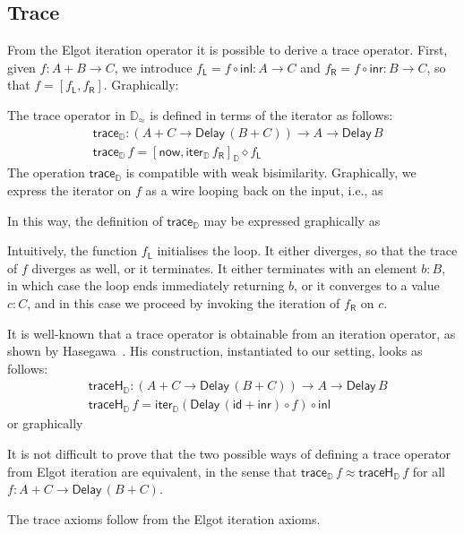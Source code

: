 \documentclass[runningheads,a4paper]{llncs}
\newcommand{\comp}{\circ}
\newcommand{\inl}{\mathsf{inl}}
\newcommand{\inr}{\mathsf{inr}}
\newcommand{\mapL}[1]{#1_{\mathsf{L}}}
\newcommand{\mapR}[1]{#1_{\mathsf{R}}}
\newcommand{\id}{\mathsf{id}}
\newcommand{\Delay}{\ensuremath{\mathsf{Delay}\,}}
\newcommand{\now}{\mathsf{now}}
\newcommand{\D}{\mathbb{D}}
\newcommand{\Dapprox}{\mathbb{D}_{\approx}}
\newcommand{\copairD}[2]{[#1,#2]_{\D}}
\newcommand{\iterD}{\mathsf{iter}_\D}
\newcommand{\traceD}{\mathsf{trace}_\D}
\newcommand{\traceHD}{\mathsf{traceH}_\D}
\begin{document}
\subsection{Trace}\label{sec:trace}

From the Elgot iteration operator it is possible to derive a trace
operator. First, given $f : A + B \to C$, we introduce
$\mapL f = f \comp \inl : A \to C$ and
$\mapR f = f \comp \inr : B \to C$, so that $f = [\mapL f , \mapR f]$.
Graphically:

The trace operator in $\Dapprox$ is defined in terms of the iterator as follows:
\begin{align*}
& \traceD : (A + C \to \Delay (B + C)) \to A \to \Delay B \\
& \traceD \,f = \copairD{\now}{\iterD \,\mapR f}\diamond \mapL f
\end{align*}
The operation $\traceD$ is compatible with weak bisimilarity. Graphically, we express the iterator on $f$ as a wire looping back on the input, i.e., as

In this way, the definition of $\traceD$ may be expressed graphically as

Intuitively, the function $\mapL f$ initialises the loop. It either
diverges, so that the trace of $f$ diverges as well, or it terminates. It either terminates with
an element $b : B$, in which case the loop ends immediately returning
$b$, or it converges to a value $c : C$, and in this case we proceed
by  invoking the iteration of $\mapR f$ on $c$.

It is well-known that a trace operator is obtainable from an iteration
operator, as shown by Hasegawa~\cite{Hasegawa97}. His construction,
instantiated to our setting, looks as follows:
\begin{align*}
& \traceHD : (A + C \to \Delay (B + C)) \to A \to \Delay B \\
& \traceHD \,f = \iterD (\Delay (\id + \inr) \comp f) \comp \inl
\end{align*}
or graphically

It is not difficult to prove that the two possible ways of defining a
trace operator from Elgot iteration are equivalent, in the sense that
$\traceD\,f \approx \traceHD\,f$ for all $f : A + C \to \Delay (B +
C)$. 

The trace axioms follow from the Elgot iteration axioms.
\end{document}
